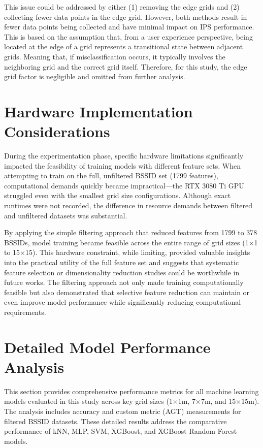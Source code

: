 \documentclass[runningheads]{llncs}
\begin{document}
This issue could be addressed by either (1) removing the edge grids and (2) collecting fewer data points in the edge grid. However, both methods result in fewer data points being collected and have minimal impact on IPS performance. This is based on the assumption that, from a user experience perspective, being located at the edge of a grid represents a transitional state between adjacent grids. Meaning that, if misclassification occurs, it typically involves the neighboring grid and the correct grid itself. Therefore, for this study, the edge grid factor is negligible and omitted from further analysis.

\section{Hardware Implementation Considerations}
During the experimentation phase, specific hardware limitations significantly impacted the feasibility of training models with different feature sets. When attempting to train on the full, unfiltered BSSID set (1799 features), computational demands quickly became impractical—the RTX 3080 Ti GPU struggled even with the smallest grid size configurations. Although exact runtimes were not recorded, the difference in resource demands between filtered and unfiltered datasets was substantial.

By applying the simple filtering approach that reduced features from 1799 to 378 BSSIDs, model training became feasible across the entire range of grid sizes (1×1 to 15×15). This hardware constraint, while limiting, provided valuable insights into the practical utility of the full feature set and suggests that systematic feature selection or dimensionality reduction studies could be worthwhile in future works. The filtering approach not only made training computationally feasible but also demonstrated that selective feature reduction can maintain or even improve model performance while significantly reducing computational requirements.

\section{Detailed Model Performance Analysis}

This section provides comprehensive performance metrics for all machine learning models evaluated in this study across key grid sizes (1×1m, 7×7m, and 15×15m). The analysis includes accuracy and custom metric (AGT) measurements for filtered BSSID datasets. These detailed results address the comparative performance of kNN, MLP, SVM, XGBoost, and XGBoost Random Forest models.
\end{document}
